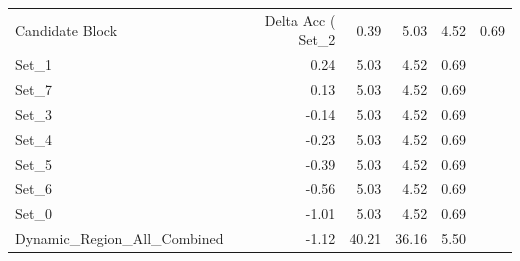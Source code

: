 \begin{tabular}{lrrrr}
\toprule
Candidate Block & Delta Acc (%
\midrule
Set_2 & 0.39 & 5.03 & 4.52 & 0.69 \\
Set_1 & 0.24 & 5.03 & 4.52 & 0.69 \\
Set_7 & 0.13 & 5.03 & 4.52 & 0.69 \\
Set_3 & -0.14 & 5.03 & 4.52 & 0.69 \\
Set_4 & -0.23 & 5.03 & 4.52 & 0.69 \\
Set_5 & -0.39 & 5.03 & 4.52 & 0.69 \\
Set_6 & -0.56 & 5.03 & 4.52 & 0.69 \\
Set_0 & -1.01 & 5.03 & 4.52 & 0.69 \\
Dynamic_Region_All_Combined & -1.12 & 40.21 & 36.16 & 5.50 \\
\bottomrule
\end{tabular}
